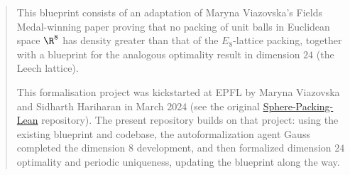%

\begin{abstract}
  This blueprint consists of an adaptation of Maryna Viazovska's Fields Medal-winning paper proving that no packing of unit balls in Euclidean space $\R^8$ has density greater than that of the $E_8$-lattice packing, together with a blueprint for the analogous optimality result in dimension $24$ (the Leech lattice).

  This formalisation project was kickstarted at EPFL by Maryna Viazovska and Sidharth Hariharan in March 2024 (see the original \href{https://github.com/thefundamentaltheor3m/Sphere-Packing-Lean}{Sphere-Packing-Lean} repository). The present repository builds on that project: using the existing blueprint and codebase, the autoformalization agent Gauss completed the dimension $8$ development, and then formalized dimension $24$ optimality and periodic uniqueness, updating the blueprint along the way.
  \end{abstract}

\tableofcontents

